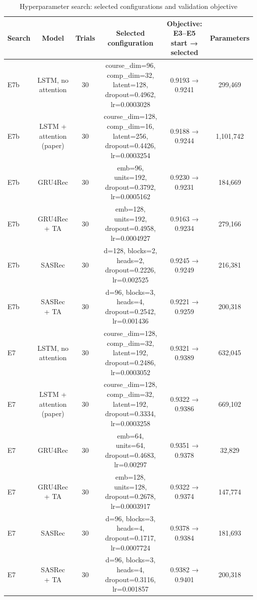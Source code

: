 \begin{table}[t]\centering\footnotesize
\caption{Hyperparameter search: selected configurations and validation objective}
\begin{tabular}{lccccc}\toprule
Search & Model & Trials & Selected configuration & Objective: E3–E5 start → selected & Parameters \\
\midrule
E7b & LSTM, no attention & 30 & course\_dim=96, comp\_dim=32, latent=128, dropout=0.4962, lr=0.0003028 & 0.9193 → 0.9241 & 299,469 \\
E7b & LSTM + attention (paper) & 30 & course\_dim=128, comp\_dim=16, latent=256, dropout=0.4426, lr=0.0003254 & 0.9188 → 0.9244 & 1,101,742 \\
E7b & GRU4Rec & 30 & emb=96, units=192, dropout=0.3792, lr=0.0005162 & 0.9230 → 0.9231 & 184,669 \\
E7b & GRU4Rec + TA & 30 & emb=128, units=192, dropout=0.4958, lr=0.0004927 & 0.9163 → 0.9234 & 279,166 \\
E7b & SASRec & 30 & d=128, blocks=2, heads=2, dropout=0.2226, lr=0.002525 & 0.9245 → 0.9249 & 216,381 \\
E7b & SASRec + TA & 30 & d=96, blocks=3, heads=4, dropout=0.2542, lr=0.001436 & 0.9221 → 0.9259 & 200,318 \\
E7 & LSTM, no attention & 30 & course\_dim=128, comp\_dim=32, latent=192, dropout=0.2486, lr=0.0003052 & 0.9321 → 0.9389 & 632,045 \\
E7 & LSTM + attention (paper) & 30 & course\_dim=128, comp\_dim=32, latent=192, dropout=0.3334, lr=0.0003258 & 0.9322 → 0.9386 & 669,102 \\
E7 & GRU4Rec & 30 & emb=64, units=64, dropout=0.4683, lr=0.00297 & 0.9351 → 0.9378 & 32,829 \\
E7 & GRU4Rec + TA & 30 & emb=128, units=128, dropout=0.2678, lr=0.0003917 & 0.9322 → 0.9374 & 147,774 \\
E7 & SASRec & 30 & d=96, blocks=3, heads=4, dropout=0.1717, lr=0.0007724 & 0.9378 → 0.9384 & 181,693 \\
E7 & SASRec + TA & 30 & d=96, blocks=3, heads=4, dropout=0.3116, lr=0.001857 & 0.9382 → 0.9401 & 200,318 \\
\bottomrule
\end{tabular}

\end{table}
